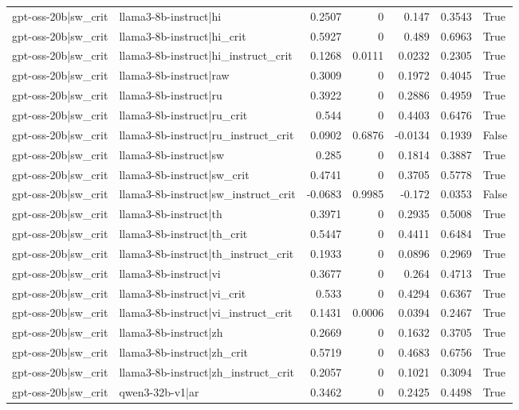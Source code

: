 \begin{table}
\begin{tabular}{l l r r r r l}
gpt-oss-20b|sw_crit & llama3-8b-instruct|hi & 0.2507 & 0 & 0.147 & 0.3543 & True \\
gpt-oss-20b|sw_crit & llama3-8b-instruct|hi_crit & 0.5927 & 0 & 0.489 & 0.6963 & True \\
gpt-oss-20b|sw_crit & llama3-8b-instruct|hi_instruct_crit & 0.1268 & 0.0111 & 0.0232 & 0.2305 & True \\
gpt-oss-20b|sw_crit & llama3-8b-instruct|raw & 0.3009 & 0 & 0.1972 & 0.4045 & True \\
gpt-oss-20b|sw_crit & llama3-8b-instruct|ru & 0.3922 & 0 & 0.2886 & 0.4959 & True \\
gpt-oss-20b|sw_crit & llama3-8b-instruct|ru_crit & 0.544 & 0 & 0.4403 & 0.6476 & True \\
gpt-oss-20b|sw_crit & llama3-8b-instruct|ru_instruct_crit & 0.0902 & 0.6876 & -0.0134 & 0.1939 & False \\
gpt-oss-20b|sw_crit & llama3-8b-instruct|sw & 0.285 & 0 & 0.1814 & 0.3887 & True \\
gpt-oss-20b|sw_crit & llama3-8b-instruct|sw_crit & 0.4741 & 0 & 0.3705 & 0.5778 & True \\
gpt-oss-20b|sw_crit & llama3-8b-instruct|sw_instruct_crit & -0.0683 & 0.9985 & -0.172 & 0.0353 & False \\
gpt-oss-20b|sw_crit & llama3-8b-instruct|th & 0.3971 & 0 & 0.2935 & 0.5008 & True \\
gpt-oss-20b|sw_crit & llama3-8b-instruct|th_crit & 0.5447 & 0 & 0.4411 & 0.6484 & True \\
gpt-oss-20b|sw_crit & llama3-8b-instruct|th_instruct_crit & 0.1933 & 0 & 0.0896 & 0.2969 & True \\
gpt-oss-20b|sw_crit & llama3-8b-instruct|vi & 0.3677 & 0 & 0.264 & 0.4713 & True \\
gpt-oss-20b|sw_crit & llama3-8b-instruct|vi_crit & 0.533 & 0 & 0.4294 & 0.6367 & True \\
gpt-oss-20b|sw_crit & llama3-8b-instruct|vi_instruct_crit & 0.1431 & 0.0006 & 0.0394 & 0.2467 & True \\
gpt-oss-20b|sw_crit & llama3-8b-instruct|zh & 0.2669 & 0 & 0.1632 & 0.3705 & True \\
gpt-oss-20b|sw_crit & llama3-8b-instruct|zh_crit & 0.5719 & 0 & 0.4683 & 0.6756 & True \\
gpt-oss-20b|sw_crit & llama3-8b-instruct|zh_instruct_crit & 0.2057 & 0 & 0.1021 & 0.3094 & True \\
gpt-oss-20b|sw_crit & qwen3-32b-v1|ar & 0.3462 & 0 & 0.2425 & 0.4498 & True \\

\end{tabular}
\end{table}
